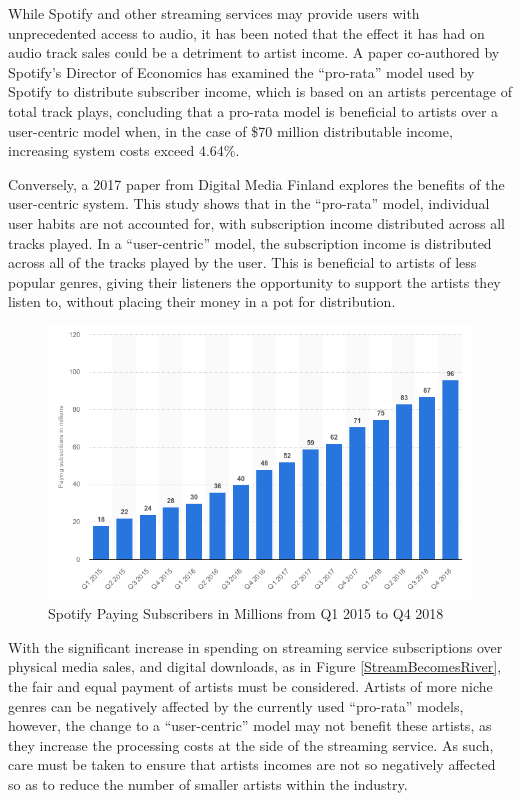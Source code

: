 \documentclass[11pt,a4paper,headinclude=false,footinclude=false]{scrreprt}
\begin{document}
While Spotify and other streaming services may provide users with
unprecedented access to audio, it has been noted that the effect it has
had on audio track sales could be a detriment to artist income. A paper
co-authored by Spotify's Director of Economics has examined the
``pro-rata'' model used by Spotify to distribute subscriber income,
which is based on an artists percentage of total track plays, concluding
that a pro-rata model is beneficial to artists over a user-centric model
when, in the case of \$70 million distributable income, increasing
system costs exceed 4.64\%\cite{allocateRevenue}.

Conversely, a 2017 paper from Digital Media Finland explores the
benefits of the user-centric system\cite{rataVuser}. This study shows
that in the ``pro-rata'' model, individual user habits are not accounted
for, with subscription income distributed across all tracks played. In a
``user-centric'' model, the subscription income is distributed across
all of the tracks played by the user. This is beneficial to artists of
less popular genres, giving their listeners the opportunity to support
the artists they listen to, without placing their money in a pot for
distribution.

\begin{figure}[H]
\includegraphics{Ethics/PayingSubscribers.png}
\centering
\caption{Spotify Paying Subscribers in Millions from Q1 2015 to Q4 2018}
\label{PayingSubs}
\end{figure}

With the significant increase in spending on streaming service
subscriptions over physical media sales, and digital downloads, as in
Figure \ref{StreamBecomesRiver}, the fair and equal payment of artists
must be considered. Artists of more niche genres can be negatively
affected by the currently used ``pro-rata'' models, however, the change
to a ``user-centric'' model may not benefit these artists, as they
increase the processing costs at the side of the streaming service. As
such, care must be taken to ensure that artists incomes are not so
negatively affected so as to reduce the number of smaller artists within
the industry.
\end{document}
